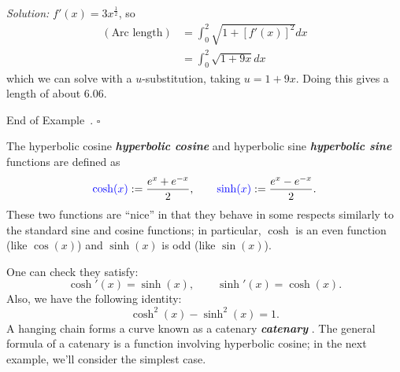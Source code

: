 \documentclass[10pt]{article}
\DeclareRobustCommand{\demph}[1]{%
  \ifmmode
  {\color{Blue}#1}%
  \else
  {\color{Blue}\bfseries\slshape #1}%
  \fi
}
\theoremstyle{definition}
\newtheorem{example}[theorem]{Example}
\renewenvironment{example}
{\begin{oldexample}}
  {\par\smallskip\hfill   End of Example~\theexample. $\square$    \par\end{oldexample}}
\newcommand{\1}[1]{\textbf{1}_{\left[#1\right]}} %
\begin{document}
\begin{example}[Arc length]
\begin{center}
  \end{center}
  \textit{Solution:} $f'(x) = 3x^{\frac{1}{2}}$, so
  \begin{align*}
    (\text{Arc length})
    &= \int_{0}^{2} \sqrt{1+\left[ f'(x) \right]^{2} }dx\\
    &= \int_{0}^{2} \sqrt{1+9x }dx
  \end{align*}
  which we can solve with a $u$-substitution, taking $u=1+9x$. Doing this
  gives a length of about $6.06$. 
\end{example}



The \demph{hyperbolic cosine} and \demph{hyperbolic sine} functions are defined as
\begin{equation*}
  \demph{\cosh(x)} := \frac{e^{x}+e^{-x}}{2},  \qquad \demph{\sinh(x)} :=  \frac{e^{x}-e^{-x}}{2}.
\end{equation*}
These two functions are ``nice'' in that they behave in some respects
similarly to the standard sine and cosine functions; in particular, $\cosh$ is
an even function  (like $\cos(x)$) and $\sinh(x)$ is odd (like $\sin(x)$).

One can check they satisfy:
\begin{equation}\label{eq:hyperbolic derivatives}
  \cosh'(x) = \sinh(x), \qquad \sinh'(x)=\cosh(x).
\end{equation}
Also, we have the following identity:
\begin{equation}\label{eq:hyperbolic-square-identity}
  \cosh^{2}(x)- \sinh^{2}(x) =1.
\end{equation}
A hanging chain forms a curve known as a \demph{catenary}. The general
formula of a catenary is a function involving hyperbolic cosine; in the next
example, we'll consider the simplest case.
\end{document}
